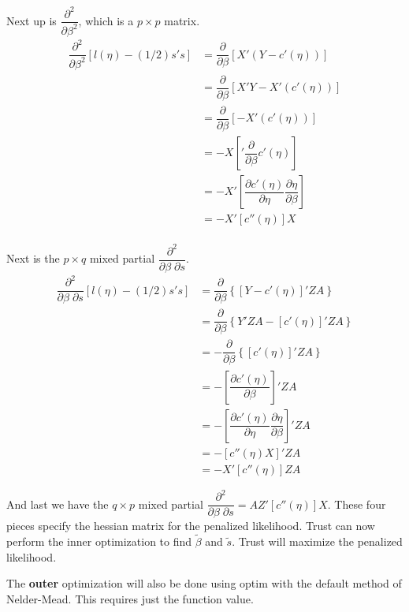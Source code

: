 \documentclass{article}
\begin{document}
Next up is  $ \dfrac{\partial^2}{\partial \beta^2}$, which is a $p \times p$ matrix.
\begin{align}
  \dfrac{\partial^2}{\partial \beta^2}  \left[ l(\eta) - (1/2) s's   \right] &=   \dfrac{\partial}{\partial \beta} \left[ X' (Y-c'(\eta))  \right]\\
&= \dfrac{\partial}{\partial \beta} \left[ X' Y-X'(c'(\eta))  \right] \\
&= \dfrac{\partial}{\partial \beta} \left[ -X'(c'(\eta))  \right] \\
&=-X  \left[' \dfrac{\partial}{\partial \beta} c'(\eta)  \right] \\
&=-X'  \left[ \dfrac{\partial  c'(\eta)}{\partial \eta} \dfrac{\partial \eta}{\partial \beta}  \right] \\
&=-X'  \left[ c''(\eta)\right]  X   \\
\end{align}

Next is the $p \times q$ mixed partial $\dfrac{\partial^2}{  \partial \beta \; \partial s}$.
\begin{align}
\dfrac{\partial^2}{ \partial \beta \;  \partial s}  \left[ l(\eta) - (1/2) s's   \right] &= \dfrac{\partial}{\partial \beta} \left\{  \left[ Y-c'(\eta)  \right]' ZA  \right\}\\
&= \dfrac{\partial}{\partial \beta} \left\{Y'ZA-  \left[ c'(\eta)  \right]' ZA  \right\} \\
&=- \dfrac{\partial}{\partial \beta} \left\{  \left[ c'(\eta)  \right]' ZA  \right\} \\
&=- \left[  \dfrac{\partial  c'(\eta)}{\partial \beta}  \right]' ZA  \\
&=-   \left[  \dfrac{\partial  c'(\eta)}{\partial \eta} \dfrac{\partial \eta}{\partial \beta}  \right]' ZA   \\
&=-   \left[ c''(\eta) X  \right]' ZA   \\
&=-X'   \left[ c''(\eta)   \right] ZA  
\end{align}


And last we have the $q \times p$ mixed partial $\dfrac{\partial^2}{  \partial \beta \; \partial s}= AZ' [c''(\eta)] X.$  These four pieces specify the hessian matrix for the penalized likelihood. Trust can now perform the inner optimization to find $\tilde{\beta}$ and $\tilde{s}$. Trust will maximize the penalized likelihood.





The {\bf outer} optimization will also be done using optim with the default method of Nelder-Mead. This requires just the function value. 
\end{document}
